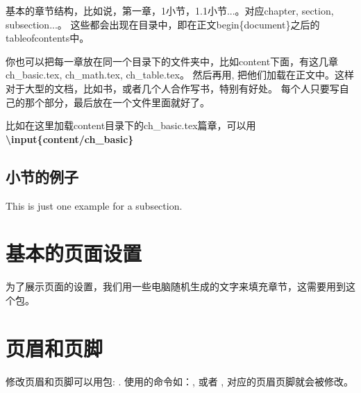 基本的章节结构，比如说，第一章，1小节，1.1小节...。对应chapter, section, subsection...。
这些都会出现在目录中，即在正文begin\{document\}之后的tableofcontents中。

你也可以把每一章放在同一个目录下的文件夹中，比如content下面，有这几章ch\_basic.tex, ch\_math.tex, ch\_table.tex。
然后再用, 把他们加载在正文中。这样对于大型的文档，比如书，或者几个人合作写书，特别有好处。
每个人只要写自己的那个部分，最后放在一个文件里面就好了。

比如在这里加载content目录下的ch\_basic.tex篇章，可以用\textbf{\textbackslash input\{content/ch\_basic\}}


\subsection{小节的例子}

This is just one example for a subsection.


\section{基本的页面设置}

为了展示页面的设置，我们用一些电脑随机生成的文字来填充章节，这需要用到这个包。

\blindtext[6]

\blindtext

\blindtext[7]


\section{页眉和页脚}


修改页眉和页脚可以用包: . 使用的命令如：,  或者 ,
对应的页眉页脚就会被修改。

